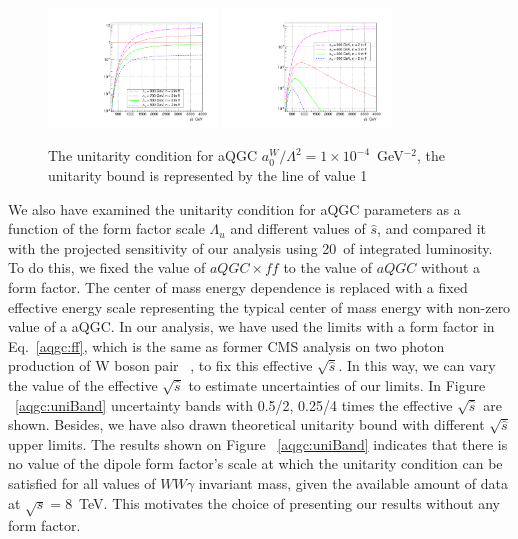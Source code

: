 \begin{figure}[]{
\centering
\includegraphics[width=0.4\textwidth]{figs/unitarity.pdf}
\includegraphics[width=0.4\textwidth]{figs/unitarity_n.pdf}
\caption{\label{aqgc:unitarity} The unitarity condition for aQGC $a_0^W/\Lambda^2 = 1\times 10^{-4}$~GeV$^{-2}$, the unitarity bound is represented by the line of value 1 }}
\end{figure}

We also have examined the unitarity condition for aQGC parameters as a function of the form factor scale $\Lambda_{u}$ and different values of $\hat{s}$, and compared it with the projected
sensitivity of our analysis using 20~\fbinv of integrated luminosity. To do this, we fixed the value of $aQGC \times ff$ to the value of $aQGC$ without a form factor. The center of mass energy dependence is replaced with a fixed effective energy scale representing the typical center of mass energy with non-zero value of a aQGC. In our analysis, we have used the limits with a form factor in Eq.~\ref{aqgc:ff}, which is the same as former CMS analysis on two photon production of W boson pair ~\cite{CMS-PAS-FSQ-12-010}, to fix this effective $\sqrt{\hat{s}}$. In this way, we can vary the value of the effective $\sqrt{\hat{s}}$ to estimate uncertainties of our limits. In Figure ~\ref{aqgc:uniBand} uncertainty bands with 0.5/2, 0.25/4 times the effective $\sqrt{\hat{s}}$ are shown. Besides, we have also drawn theoretical unitarity bound with different $\sqrt{\hat{s}}$ upper limits. The results shown on Figure ~\ref{aqgc:uniBand} indicates that there is no value of the dipole form factor's scale at
which the unitarity condition can be satisfied for all values of
$WW\gamma$ invariant mass, given the available amount of data at
$\sqrt{s}=8$~TeV. This motivates the choice of presenting our results
without any form factor.

